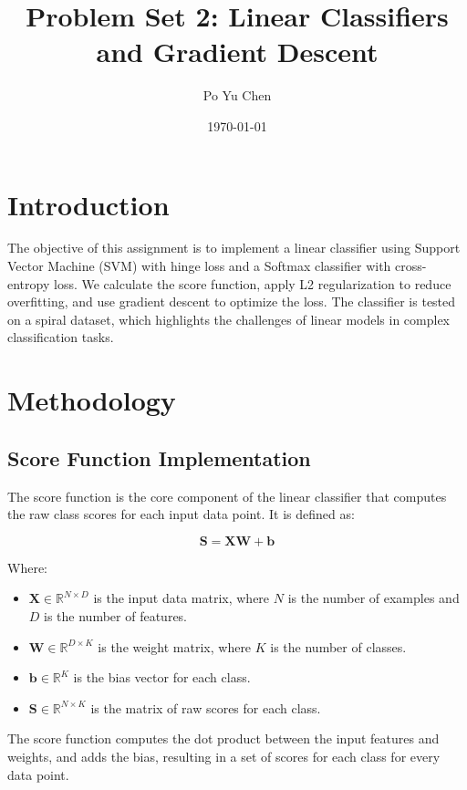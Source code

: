 \documentclass{article}
\title{Problem Set 2: Linear Classifiers and Gradient Descent}
\author{Po Yu Chen}
\date{\today}
\begin{document}
\maketitle

\section{Introduction}
The objective of this assignment is to implement a linear classifier using Support Vector Machine (SVM) with hinge loss and a Softmax classifier with cross-entropy loss. We calculate the score function, apply L2 regularization to reduce overfitting, and use gradient descent to optimize the loss. The classifier is tested on a spiral dataset, which highlights the challenges of linear models in complex classification tasks.


\section{Methodology}

\subsection{Score Function Implementation}
The score function is the core component of the linear classifier that computes the raw class scores for each input data point. It is defined as:

\begin{equation}
    \mathbf{S} = \mathbf{X} \mathbf{W} + \mathbf{b}
\end{equation}

Where:
\begin{itemize}
    \item \( \mathbf{X} \in \mathbb{R}^{N \times D} \) is the input data matrix, where \( N \) is the number of examples and \( D \) is the number of features.
    \item \( \mathbf{W} \in \mathbb{R}^{D \times K} \) is the weight matrix, where \( K \) is the number of classes.
    \item \( \mathbf{b} \in \mathbb{R}^{K} \) is the bias vector for each class.
    \item \( \mathbf{S} \in \mathbb{R}^{N \times K} \) is the matrix of raw scores for each class.
\end{itemize}

The score function computes the dot product between the input features and weights, and adds the bias, resulting in a set of scores for each class for every data point.
\end{document}
